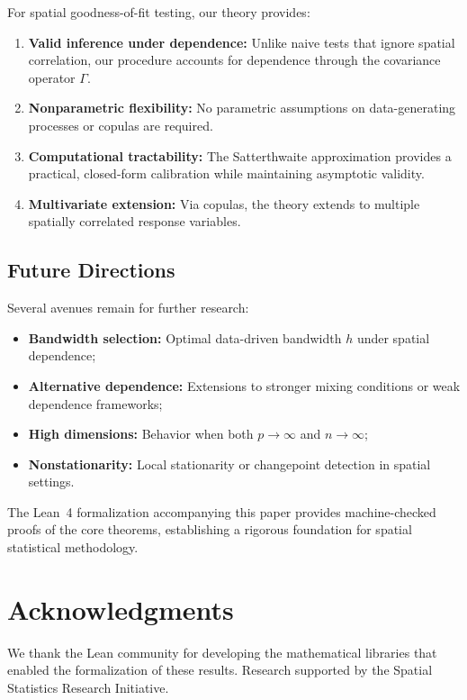 For spatial goodness-of-fit testing, our theory provides:
\begin{enumerate}
\item \textbf{Valid inference under dependence:} Unlike naive tests that ignore spatial correlation, our procedure accounts for dependence through the covariance operator $\Gamma$.

\item \textbf{Nonparametric flexibility:} No parametric assumptions on data-generating processes or copulas are required.

\item \textbf{Computational tractability:} The Satterthwaite approximation provides a practical, closed-form calibration while maintaining asymptotic validity.

\item \textbf{Multivariate extension:} Via copulas, the theory extends to multiple spatially correlated response variables.
\end{enumerate}

\subsection{Future Directions}

Several avenues remain for further research:
\begin{itemize}
\item \textbf{Bandwidth selection:} Optimal data-driven bandwidth $h$ under spatial dependence;
\item \textbf{Alternative dependence:} Extensions to stronger mixing conditions or weak dependence frameworks;
\item \textbf{High dimensions:} Behavior when both $p \to \infty$ and $n \to \infty$;
\item \textbf{Nonstationarity:} Local stationarity or changepoint detection in spatial settings.
\end{itemize}

The Lean~4 formalization accompanying this paper provides machine-checked proofs of the core theorems, establishing a rigorous foundation for spatial statistical methodology.



\section*{Acknowledgments}

We thank the Lean community for developing the mathematical libraries that enabled the formalization of these results. Research supported by the Spatial Statistics Research Initiative.
